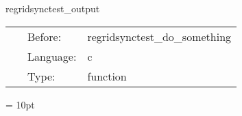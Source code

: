 \vspace{5mm}


\hspace{5mm} regridsynctest\_output 

\hspace{5mm}{\it do something at postregrid } 


\hspace{5mm}

 \begin{tabular*}{160mm}{cll} 
~ & Before:  & regridsynctest\_do\_something \\ 
~ & Language:  & c \\ 
~ & Type:  & function \\ 
\end{tabular*} 



\vspace{5mm}\parskip = 10pt 
